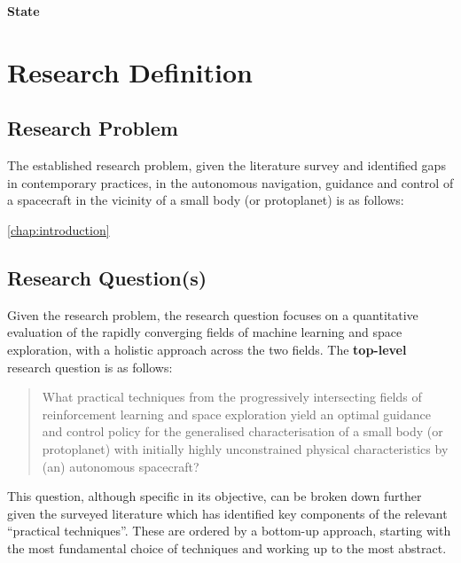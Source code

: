 \textbf{State}

\section{Research Definition}

\subsection{Research Problem}

The established research problem, given the literature survey and identified gaps in contemporary practices, in the autonomous navigation, guidance and control of a spacecraft in the vicinity of a small body (or protoplanet) is as follows:

\autoref{chap:introduction}

\begin{quote}

\end{quote}

\newpage\subsection{Research Question(s)}

Given the research problem, the research question focuses on a quantitative evaluation of the rapidly converging fields of machine learning and space exploration, with a holistic approach across the two fields. The \textbf{top-level} research question is as follows:

\begin{quote}
    What practical techniques from the progressively intersecting fields of reinforcement learning and space exploration yield an optimal guidance and control policy for the generalised characterisation of a small body (or protoplanet) with initially highly unconstrained physical characteristics by (an) autonomous spacecraft?
\end{quote}

This question, although specific in its objective, can be broken down further given the surveyed literature which has identified key components of the relevant ``practical techniques''. These are ordered by a bottom-up approach, starting with the most fundamental choice of techniques and working up to the most abstract.


